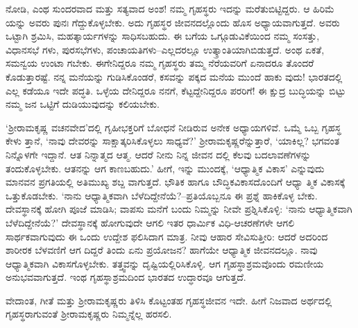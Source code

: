 ನೋಡಿ, ಎಂಥ ಸುಂದರವಾದ ಮತ್ತು ಸತ್ಯವಾದ ಅಂಶ! ನಮ್ಮ ಗೃಹಸ್ಥರು ಇದನ್ನು ಮರೆತುಬಿಟ್ಟಿದ್ದರು. ಆ ಹಿರಿಮೆ ಯನ್ನು ಅವರು ಪುನಃ ಗೆದ್ದುಕೊಳ್ಳಬೇಕು. ಅದು ಗೃಹಸ್ಥರ ಜೀವನದಲ್ಲೊಂದು ಹೊಸ ಅಧ್ಯಾಯವಾಗುತ್ತದೆ. ಅವರು ಒಟ್ಟಾಗಿ ಶ್ರಮಿಸಿ, ಮಹತ್ಕಾರ್ಯಗಳನ್ನು ಸಾಧಿಸಬಹುದು. ಈ ಬಗೆಯ ಒಗ್ಗೂಡುವಿಕೆಯಿಂದ ನಮ್ಮ ಸಂಸತ್ತು, ವಿಧಾನಸಭೆ ಗಳು, ಪುರಸಭೆಗಳು, ಪಂಚಾಯತಿಗಳು–ಎಲ್ಲದರಲ್ಲೂ ಉತ್ಕ್ರಾಂತಿಯಾಗಿಬಿಡುತ್ತದೆ. ಅಂಥ ಏಕತೆ, ಸಮನ್ವಯ ಉಂಟಾ ಗಬೇಕು. ಈಗೇನಿದ್ದರೂ ನಮ್ಮ ಗೃಹಸ್ಥರು ತಮ್ಮ ನೆರೆಯವರಿಗೆ ಏನಾದರೂ ತೊಂದರೆ ಕೊಡುತ್ತಾರಷ್ಟೆ. ನನ್ನ ಮನೆಯನ್ನು ಗುಡಿಸಿಕೊಂಡರೆ, ಕಸವನ್ನು ಪಕ್ಕದ ಮನೆಯ ಮುಂದೆ ಹಾಕು ವುದು! ಭಾರತದಲ್ಲಿ ಎಲ್ಲ ಕಡೆಯೂ ಇದೇ ಪದ್ಧತಿ. ಒಳ್ಳೆಯ ದೇನಿದ್ದರೂ ನನಗೆ, ಕೆಟ್ಟದ್ದೇನಿದ್ದರೂ ಪರರಿಗೆ! ಈ ಕ್ಷುದ್ರ ಬುದ್ಧಿಯನ್ನು ಬಿಟ್ಟು ನಮ್ಮ ಜನ ಒಟ್ಟಿಗೆ ದುಡಿಯುವುದನ್ನು ಕಲಿಯಬೇಕು. 

‘ಶ್ರೀರಾಮಕೃಷ್ಣ ವಚನವೇದ’ದಲ್ಲಿ ಗೃಹೀಭಕ್ತರಿಗೆ ಬೋಧನೆ ನೀಡಿರುವ ಅನೇಕ ಅಧ್ಯಾಯಗಳಿವೆ. ಒಮ್ಮೆ ಒಬ್ಬ ಗೃಹಸ್ಥ ಕೇಳು ತ್ತಾನೆ, ‘ನಾವು ದೇವರನ್ನು ಸಾಕ್ಷಾತ್ಕರಿಸಿಕೊಳ್ಳಲು ಸಾಧ್ಯವೆ?’ ಶ್ರೀರಾಮಕೃಷ್ಣರೆನ್ನುತ್ತಾರೆ, ‘ಯಾಕಿಲ್ಲ? ಭಗವಂತ ನಿನ್ನೊಳಗೇ ಇದ್ದಾನೆ. ಆತ ನಿನ್ನಾತ್ಮದ ಆತ್ಮ. ಆದರೆ ನೀನು ನಿನ್ನ ಜೀವನ ದಲ್ಲಿ ಕೆಲವು ಬದಲಾವಣೆಗಳನ್ನು ತಂದುಕೊಳ್ಳಬೇಕು. ಆತನನ್ನು ಆಗ ಕಾಣಬಹುದು.’ ಹೀಗೆ, ಇನ್ನು ಮುಂದಕ್ಕೆ, ‘ಆಧ್ಯಾತ್ಮಿಕ ವಿಕಾಸ’ ಎನ್ನುವುದು ಮಾನವನ ಪ್ರಗತಿಯಲ್ಲಿ ಅತಿಮುಖ್ಯ ಶಬ್ದ ವಾಗುತ್ತದೆ. ಭೌತಿಕ ಹಾಗೂ ಬೌದ್ಧಿಕವಿಕಾಸದೊಂದಿಗೆ ಆಧ್ಯಾ ತ್ಮಿಕ ವಿಕಾಸಕ್ಕೆ ಒತ್ತುಕೊಡಬೇಕು. ‘ನಾನು ಆಧ್ಯಾತ್ಮಿಕವಾಗಿ ಬೆಳೆದಿದ್ದೇನೆಯೆ?–ಪ್ರತಿಯೊಬ್ಬನೂ ಈ ಪ್ರಶ್ನೆ ಹಾಕಿಕೊಳ್ಳ ಬೇಕು. ದೇವಸ್ಥಾನಕ್ಕೆ ಹೋಗಿ ಪೂಜೆ ಮಾಡಿಸಿ; ವಾಪಸು ಮನೆಗೆ ಬಂದು ನಿಮ್ಮನ್ನು ನೀವೇ ಪ್ರಶ್ನಿಸಿಕೊಳ್ಳಿ: ‘ನಾನು ಆಧ್ಯಾತ್ಮಿಕವಾಗಿ ಬೆಳೆದಿದ್ದೇನೆಯೆ?’ ದೇವಸ್ಥಾನಕ್ಕೆ ಹೋಗುವುದೇ ಆಗಲಿ ಇತರ ಧಾರ್ಮಿಕ ವಿಧಿ-ಆಚರಣೆಗಳೇ ಆಗಲಿ ಸಾರ್ಥಕವಾಗುವುದು ಈ ಒಂದು ಉದ್ದೇಶ ಫಲಿಸಿದಾಗ ಮಾತ್ರ. ನೀವು ಆಹಾರ ಸೇವಿಸುತ್ತೀರಿ: ಆದರೆ ಅದರಿಂದ ಶಾರೀರಕ ಬೆಳವಣಿಗೆ ಆಗ ದಿದ್ದರೆ ತಿಂದು ಏನು ಪ್ರಯೋಜನ? ಹಾಗೆಯೇ ಆಧ್ಯಾತ್ಮಿಕ ಜೀವನದಲ್ಲೂ. ನಾವು ಆಧ್ಯಾತ್ಮಿಕವಾಗಿ ವಿಕಾಸಗೊಳ್ಳಬೇಕು. ತತ್ತ್ವವನ್ನು ದೃಷ್ಟಿಯಲ್ಲಿರಿಸಿಕೊಳ್ಳಿ. ಆಗ ಗೃಹಸ್ಥಾಶ್ರಮವೊಂದು ರಮಣೀಯ ಅನುಭವವಾಗುತ್ತದೆ. ಇಂಥ ಗೃಹಸ್ಥಾಶ್ರಮದಿಂದ ಭಾರತದ ಉದ್ಧಾರವೂ ಆಗುತ್ತದೆ.

ವೇದಾಂತ, ಗೀತೆ ಮತ್ತು ಶ್ರೀರಾಮಕೃಷ್ಣರು ತಿಳಿಸಿ ಕೊಟ್ಟಂತಹ ಗೃಹಸ್ಥಜೀವನ ಇದೇ. ಹೀಗೆ ನಿಜವಾದ ಅರ್ಥದಲ್ಲಿ ಗೃಹಸ್ಥರಾಗುವಂತೆ ಶ್ರೀರಾಮಕೃಷ್ಣರು ನಿಮ್ಮನ್ನೆಲ್ಲ ಹರಸಲಿ.

